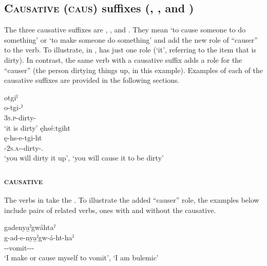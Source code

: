 \subsection{\textsc{Causative} (\textsc{caus}) suffixes (, , and )} \label{Causative suffixes}
The three causative suffixes are , , and . They mean ‘to cause someone to do something’ or ‘to make someone do something’ and add the new role of “causer” to the verb. To illustrate, in ,  has just one role (‘it’, referring to the item that is dirty). In contrast, the same verb with a causative suffix  adds a role for the “causer” (the person dirtying things up, in this example). Examples of each of the causative suffixes are provided in the following sections.

\ea\label{ex:causex}
\ea otgiˀ\\\label{ex:causexa}
\gll o-tgi-ˀ\\
 \textsc{3s.p}-dirty-{\stative}\\
\glt `it is dirty'
\ex ęhsé:tgiht \\\label{ex:causexb}
\gll ę-hs-e-tgi-ht\\
 \fut-\textsc{2s.a}-{\joinerE}-dirty-.{\zeropunctual}\\
\glt ‘you will dirty it up’, `you will cause it to be dirty'
\z
\z


\subsubsection{ \textsc{causative}} \label{[-ht, -hd] (causative)}
The verbs in  take the  {\causative}. To illustrate the added “causer” role, the examples below include pairs of related verbs, ones with and without the causative.

\ea\label{ex:causex2} 
\ea gadenya̱ˀgwáhtaˀ \\
\gll g-ad-e-nya̱ˀgw-á-ht-haˀ\\
 -{\joinerE}-vomit-{\joinerA}-{\causative}-{\habitual}\\
\glt ‘I make or cause myself to vomit’, `I am bulemic'


